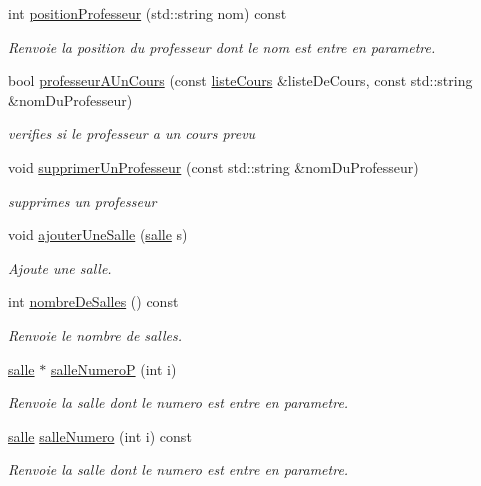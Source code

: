 \begin{DoxyCompactItemize}
int \hyperlink{classliste_ressources_a1d7b514a5f879849283a5326bd102d9c}{position\+Professeur} (std\+::string nom) const
\begin{DoxyCompactList}\small\item\em Renvoie la position du professeur dont le nom est entre en parametre. \end{DoxyCompactList}\item 
bool \hyperlink{classliste_ressources_a9500ccbddb1b0a65fbc2819dcfba3fb4}{professeur\+A\+Un\+Cours} (const \hyperlink{classliste_cours}{liste\+Cours} \&liste\+De\+Cours, const std\+::string \&nom\+Du\+Professeur)
\begin{DoxyCompactList}\small\item\em verifies si le professeur a un cours prevu \end{DoxyCompactList}\item 
void \hyperlink{classliste_ressources_acf367bf8942e1578db883d066f1e0cf3}{supprimer\+Un\+Professeur} (const std\+::string \&nom\+Du\+Professeur)
\begin{DoxyCompactList}\small\item\em supprimes un professeur \end{DoxyCompactList}\item 
void \hyperlink{classliste_ressources_ae5c412bcd7a536081d98181e836d578b}{ajouter\+Une\+Salle} (\hyperlink{classsalle}{salle} s)
\begin{DoxyCompactList}\small\item\em Ajoute une salle. \end{DoxyCompactList}\item 
int \hyperlink{classliste_ressources_a1a7f82a289bda61cf08485e92dd32b2e}{nombre\+De\+Salles} () const
\begin{DoxyCompactList}\small\item\em Renvoie le nombre de salles. \end{DoxyCompactList}\item 
\hyperlink{classsalle}{salle} $\ast$ \hyperlink{classliste_ressources_a1badd55beb2e05645cc17d488fd0a3b9}{salle\+NumeroP} (int i)
\begin{DoxyCompactList}\small\item\em Renvoie la salle dont le numero est entre en parametre. \end{DoxyCompactList}\item 
\hyperlink{classsalle}{salle} \hyperlink{classliste_ressources_ae49f2ce49be854dda108840fd3d26112}{salle\+Numero} (int i) const
\begin{DoxyCompactList}\small\item\em Renvoie la salle dont le numero est entre en parametre. \end{DoxyCompactList}\item 

\end{DoxyCompactItemize}
